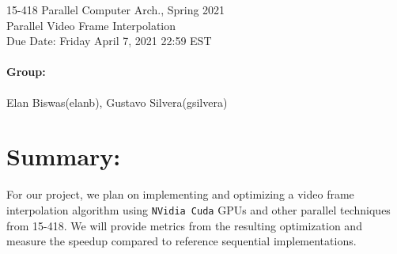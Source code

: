 \documentclass[12pt]{article}
\begin{document}
\begin{centering}
    {\large 15-418 Parallel Computer Arch., Spring 2021\\}
    \vspace{2ex}
    {\LARGE Parallel Video Frame Interpolation\\}
    \vspace{2ex}
    {\large Due Date: Friday April 7, 2021 22:59 EST\\}
\end{centering}

\bigskip

\paragraph{Group:} Elan Biswas(elanb), Gustavo Silvera(gsilvera)

\section*{Summary:} 
\par For our project, we plan on implementing and optimizing a video frame interpolation algorithm using \texttt{NVidia Cuda} GPUs and other parallel techniques from 15-418. We will provide metrics from the resulting optimization and measure the speedup compared to reference sequential implementations.  
\end{document}

